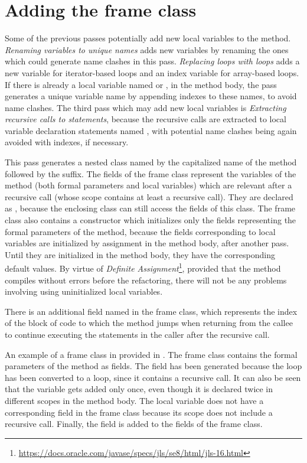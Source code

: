 \section{Adding the frame class}

Some of the previous passes potentially add new local variables to the method. \textit{Renaming variables to unique
names} adds new variables by renaming the ones which could generate name clashes in this pass.
\textit{Replacing  loops with  loops} adds a new  variable for iterator-based
 loops and an index variable  for array-based  loops. If there is already a local
variable named  or , in the method body, the pass generates a unique variable name by appending
indexes to these names, to avoid name clashes. The third pass which may add new local variables is
\textit{Extracting recursive calls to statements}, because the recursive calls are extracted to local variable
declaration statements named , with potential name clashes being again avoided with indexes, if necessary.

This pass generates a  nested class named by the capitalized name of the method followed by the
 suffix. The fields of the frame class represent the variables of the method (both formal parameters and
local variables) which are relevant after a recursive call (whose scope contains at least a recursive call). They are
declared as , because the enclosing class can still access the fields of this class. The frame class also
contains a  constructor which initializes only the fields representing the formal parameters of the
method, because the fields corresponding to local variables are initialized by assignment in the method body,
after another pass. Until they are initialized in the method body, they have the corresponding default values.
By virtue of \textit{Definite Assignment}\footnote{\url{https://docs.oracle.com/javase/specs/jls/se8/html/jls-16.html}},
provided that the method compiles without errors before the refactoring, there will not be any problems involving using
uninitialized local variables.

There is an additional  field named  in the frame class, which represents the index of the
block of code to which the method jumps when returning from the callee to continue executing the statements in the
caller after the recursive call.

An example of a frame class in provided in .
The frame class contains the formal parameters of the method as fields. The field  has been generated
because the  loop has been converted to a  loop, since it contains a recursive call. It can also
be seen that the variable  gets added only once, even though it is declared twice in different scopes in the
method body. The local variable  does not have a corresponding field in the frame class because its scope does
not include a recursive call. Finally, the  field is added to the fields of the frame class.

